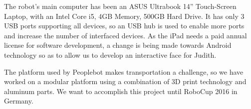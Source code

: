 The robot's main computer has been an ASUS Ultrabook 14'' Touch-Screen Laptop, with an Intel Core i5, 4GB Memory, 500GB Hard Drive. It has only 3 USB ports supporting all devices, so an USB hub is used to enable more ports and increase the number of interfaced devices. As the iPad needs a paid annual license for software development, a change is being made towards Android technology so as to allow us to develop an interactive face for Judith.

The platform used by Peoplebot makes transportation a challenge, so we have worked on a modular platform using a combination of 3D print technology and aluminum parts. We want to accomplish this project until RoboCup 2016 in Germany.
